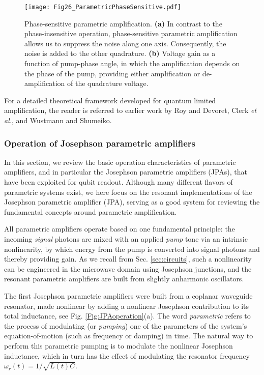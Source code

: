 \documentclass[aip,apr,twocolumn,showpacs,superscriptaddress,groupedaddress,nofootinbib,reprint]{revtex4-1}  %
\begin{document}
\begin{figure}[htp]
\begin{center}
\texttt{[image: Fig26\_ParametricPhaseSensitive.pdf]}
\caption{Phase-sensitive parametric amplification. \textbf{(a)} In contrast to the phase-insensitive operation, phase-sensitive parametric amplification allows us to suppress the noise along one axis. Consequently, the noise is added to the other quadrature. \textbf{(b)} Voltage gain as a function of pump-phase angle, in which the amplification depends on the phase of the pump, providing either amplification or de-amplification of the quadrature voltage.}
\label{Fig:PhaseSensitiveAmplification}
\end{center}
\end{figure}

For a detailed theoretical framework developed for quantum limited amplification, the reader is referred to earlier work by Roy and Devoret\cite{Roy2016}, Clerk \textit{et al.}\cite{Clerk2010}, and Wustmann and Shumeiko\cite{Wustmann2013}.


\subsubsection{Operation of Josephson parametric amplifiers}

In this section, we review the basic operation characteristics of parametric amplifiers, and in particular the Josephson parametric amplifiers (JPAs), that have been exploited for qubit readout. Although many different flavors of parametric systems exist, we here focus on the resonant implementations of the Josephson parametric amplifier (JPA), serving as a good system for reviewing the fundamental concepts around parametric amplification.

All parametric amplifiers operate based on one fundamental principle: the incoming \textit{signal} photons are mixed with an applied \textit{pump} tone via an intrinsic nonlinearity, by which energy from the pump is converted into signal photons and thereby providing gain. As we recall from Sec. \ref{sec:circuits}, such a nonlinearity can be engineered in the microwave domain using Josephson junctions\cite{Dolan1977}, and the resonant parametric amplifiers are built from slightly anharmonic oscillators.

The first Josephson parametric amplifiers were built from a coplanar waveguide resonator, made nonlinear by adding a nonlinear Josephson contribution to its total inductance, see Fig. \ref{Fig:JPAoperation}(a). The word \textit{parametric} refers to the process of modulating (or \textit{pumping}) one of the parameters of the system's equation-of-motion (such as frequency or damping) in time\cite{Yurke1989,Wustmann2013,Wustmann2017}. The natural way to perform this parametric pumping is to modulate the nonlinear Josephson inductance, which in turn has the effect of modulating the resonator frequency $\omega_r(t) = 1/\sqrt{L(t)C}$.
\end{document}
